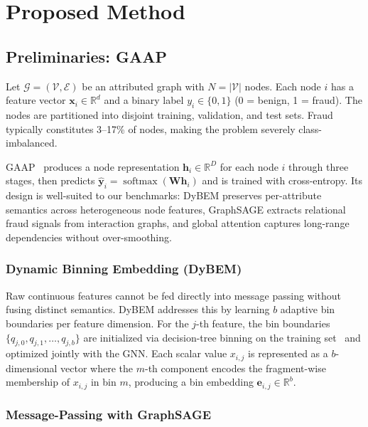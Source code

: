 \section{Proposed Method}
\label{sec:method}

\subsection{Preliminaries: GAAP}

Let $\mathcal{G} = (\mathcal{V}, \mathcal{E})$ be an attributed graph with $N = |\mathcal{V}|$ nodes. Each node $i$ has a feature vector $\mathbf{x}_i \in \mathbb{R}^d$ and a binary label $y_i \in \{0, 1\}$ (0 = benign, 1 = fraud). The nodes are partitioned into disjoint training, validation, and test sets. Fraud typically constitutes 3--17\% of nodes, making the problem severely class-imbalanced.

GAAP~\cite{duan2025gaap} produces a node representation $\mathbf{h}_i \in \mathbb{R}^D$ for each node $i$ through three stages, then predicts $\hat{\mathbf{y}}_i = \operatorname{softmax}(\mathbf{W} \mathbf{h}_i)$ and is trained with cross-entropy. Its design is well-suited to our benchmarks: DyBEM preserves per-attribute semantics across heterogeneous node features, GraphSAGE extracts relational fraud signals from interaction graphs, and global attention captures long-range dependencies without over-smoothing.

\subsubsection{Dynamic Binning Embedding (DyBEM)}

Raw continuous features cannot be fed directly into message passing without fusing distinct semantics. DyBEM addresses this by learning $b$ adaptive bin boundaries per feature dimension. For the $j$-th feature, the bin boundaries $\{q_{j,0}, q_{j,1}, \dots, q_{j,b}\}$ are initialized via decision-tree binning on the training set~\cite{duan2025gaap} and optimized jointly with the GNN. Each scalar value $x_{i,j}$ is represented as a $b$-dimensional vector where the $m$-th component encodes the fragment-wise membership of $x_{i,j}$ in bin $m$, producing a bin embedding $\mathbf{e}_{i,j} \in \mathbb{R}^{b}$.

\subsubsection{Message-Passing with GraphSAGE}

